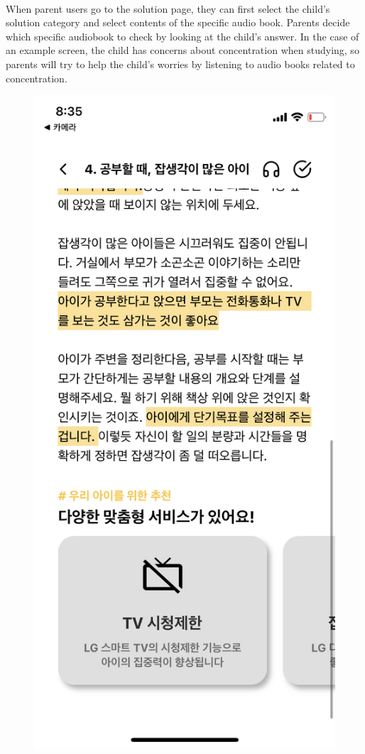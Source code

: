 \documentclass[conference]{IEEEtran}
\begin{document}
\begin{enumerate}
\begin{enumerate}
        \\When parent users go to the solution page, they can first select the child's solution category and select contents of the specific audio book. Parents decide which specific audiobook to check by looking at the child's answer. In the case of an example screen, the child has concerns about concentration when studying, so parents will try to help the child's worries by listening to audio books related to concentration.
        \begin{figure}[H]
        \centering
        \includegraphics[scale=0.1]{UseCases/10.lg.png}

\end{figure}
\end{enumerate}
\end{enumerate}
\end{document}
